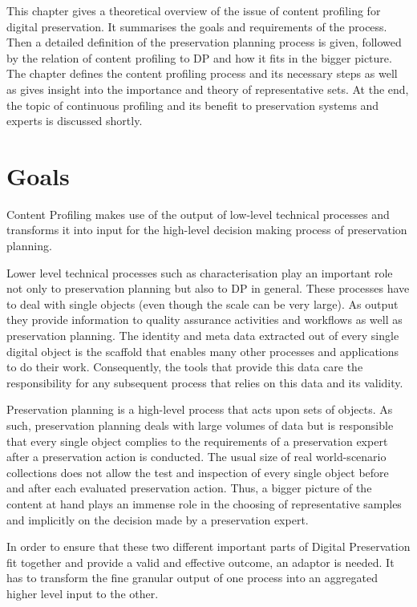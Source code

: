 This chapter gives a theoretical overview of the issue of content profiling for digital preservation. It summarises the goals and requirements of the process. Then a detailed definition of the preservation planning process is given, followed by the relation of content profiling to DP and how it fits in the bigger picture. The chapter defines the content profiling process and its necessary steps as well as gives insight into the importance and theory of representative sets. At the end, the topic of continuous profiling and its benefit to preservation systems and experts is discussed shortly.

\section {Goals}
\label{sec:goals}
Content Profiling makes use of the output of low-level technical processes and transforms it into input for the high-level decision making process of preservation planning.

Lower level technical processes such as characterisation play an important role not only to preservation planning but also to DP in general. These processes have to deal with single objects (even though the scale can be very large). As output they provide information to quality assurance activities and workflows as well as preservation planning. The identity and meta data extracted out of every single digital object is the scaffold that enables many other processes and applications to do their work. Consequently, the tools that provide this data care the responsibility for any subsequent process that relies on this data and its validity.

Preservation planning is a high-level process that acts upon sets of objects. As such, preservation planning deals with large volumes of data but is responsible that every single object complies to the requirements of a preservation expert after a preservation action is conducted. The usual size of real world-scenario collections does not allow the test and inspection of every single object before and after each evaluated preservation action. Thus, a bigger picture of the content at hand plays an immense role in the choosing of representative samples and implicitly on the decision made by a preservation expert.

In order to ensure that these two different important parts of Digital Preservation fit together and provide a valid and effective outcome, an adaptor is needed. It has to transform the fine granular output of one process into an aggregated higher level input to the other.

